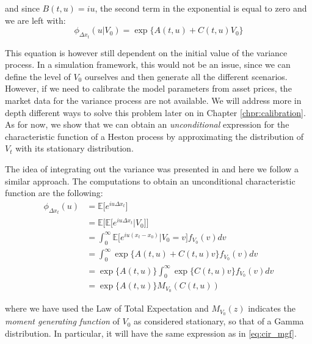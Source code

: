 and since $B(t,u)  = i u$, the second term in the exponential is equal to zero and we are left with:
\begin{equation}
\label{eq:chf_V0}
\phi_{\Delta x_t}(u|V_0) =  \exp\{A(t,u) + C(t,u) V_0\}
\end{equation}




This equation is however still dependent on the initial value of the variance process. In a simulation framework, this would not be an issue, since we can define the level of $V_0$ ourselves and then generate all the different scenarios. However, if we need to calibrate the model parameters from asset prices, the market data for the variance process are not available. We will address more in depth different ways to solve this problem later on in Chapter \ref{chpr:calibration}. As for now, we show that we can obtain an \textit{unconditional} expression for the characteristic function of a Heston process by approximating the distribution of $V_t$ with its stationary distribution.

The idea of integrating out the variance was presented in \citep{DRAGULESCU2002} and here we follow a similar approach.
The computations to obtain an unconditional characteristic function are the following:
\begin{equation*}
\begin{split}
	\phi_{\Delta x_t}(u) &= \mathbb{E}\big[e^{i u \Delta x_t} \big] \\
	&= \mathbb{E}\big[ \mathbb{E}\big[ e^{i u \Delta x_t} | V_0\big] \big]\\
	&=  \int_{0}^{\infty} \mathbb{E}\big[e^{i u ( x_t - x_0)}|V_0 = v \big] f_{V_0}(v) dv \\
	&= \int_{0}^{\infty} \exp\{A(t,u) + C(t,u) v\} f_{V_0}(v) dv \\
	&=  \exp\{A(t,u)\} \int_{0}^{\infty}  \exp \{C(t,u) v\} f_{V_0}(v) dv\\
	&= \exp\{A(t,u) \} M_{V_0}(C(t,u))
\end{split}
\end{equation*}

where we have used the Law of Total Expectation and $M_{V_0}(z)$ indicates the \textit{moment generating function} of $V_0$ as considered stationary, so that of a Gamma distribution. In particular, it will have the same expression as in \eqref{eq:cir_mgf}.




